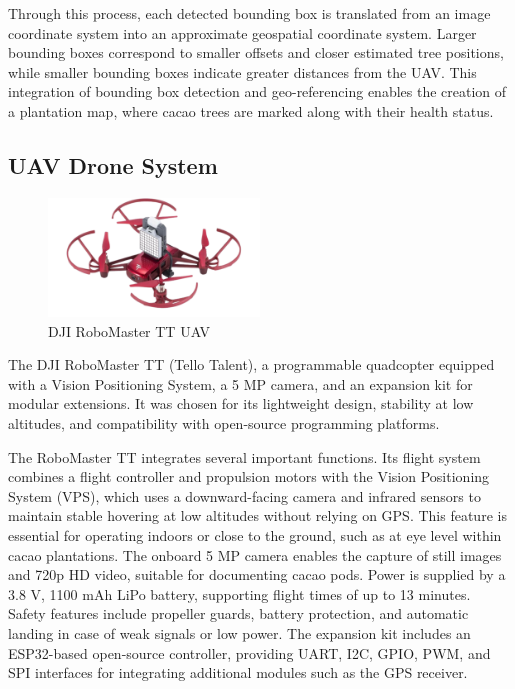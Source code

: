 Through this process, each detected bounding box is translated from an image coordinate system into an approximate geospatial coordinate system. Larger bounding boxes correspond to smaller offsets and closer estimated tree positions, while smaller bounding boxes indicate greater distances from the UAV. This integration of bounding box detection and geo-referencing enables the creation of a plantation map, where cacao trees are marked along with their health status.


\subsection{UAV Drone System}

\begin{figure}[H]
	\centering
	\caption{DJI RoboMaster TT UAV}
	\label{fig:robomaster_tt}
	\includegraphics[width=0.5\textwidth]{figures/Robomaster_TT.pdf}
\end{figure}


The DJI RoboMaster TT (Tello Talent), a programmable quadcopter
equipped with a Vision Positioning System, a 5 MP camera, and an expansion kit for modular extensions.
It was chosen for its lightweight design, stability at low altitudes, and compatibility with open-source
programming platforms.

The RoboMaster TT integrates several important functions. Its flight system combines a flight controller
and propulsion motors with the Vision Positioning System (VPS), which uses a downward-facing camera and
infrared sensors to maintain stable hovering at low altitudes without relying on GPS. This feature is
essential for operating indoors or close to the ground, such as at eye level within cacao plantations.
The onboard 5 MP camera enables the capture of still images and 720p HD video, suitable for documenting
cacao pods. Power is supplied by a 3.8 V, 1100 mAh LiPo battery, supporting flight times of up to
13 minutes. Safety features include propeller guards, battery protection, and automatic landing in case
of weak signals or low power. The expansion kit includes an ESP32-based open-source controller, providing
UART, I2C, GPIO, PWM, and SPI interfaces for integrating additional modules such as the GPS receiver.

